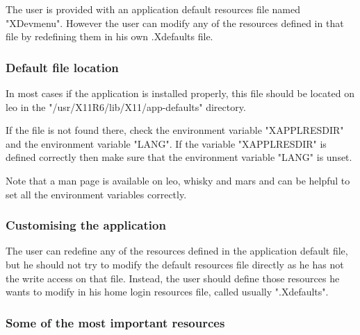 %
%
%
%
%
%
%
%
%
%
The user is provided with an application default resources file named
"XDevmenu". However the user can modify any of the resources defined in that
file by redefining them in his own .Xdefaults file.

\subsubsection{Default file location}

In most cases if the application is installed properly, this file
should be located on leo in the "/usr/X11R6/lib/X11/app-defaults" directory.

If the file is not found there, check the environment variable "XAPPLRESDIR"
and the environment variable "LANG". If the variable "XAPPLRESDIR" is defined
correctly then make sure that the environment variable "LANG" is unset.

Note that a man page is available on leo, whisky and mars and can be helpful to set all the environment variables correctly.

\subsubsection{Customising the application}

The user can redefine any of the resources defined in the application default
file, but he should not try to modify the default resources file directly as
he has not the write access on that file. Instead, the user should define those
resources he wants to modify in his home login resources file, called usually
".Xdefaults".

\subsubsection{Some of the most important resources}

